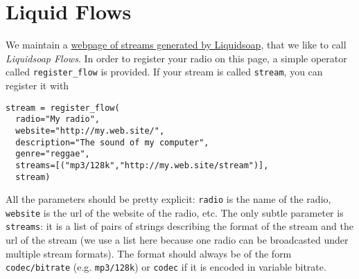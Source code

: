 \section{Liquid Flows}
We maintain a \href{http://savonet.sourceforge.net/flows.html}{webpage of streams generated by
Liquidsoap}, that we like to call
\emph{Liquidsoap Flows}. In order to register your radio on this page, a simple
operator called \verb+register_flow+ is provided. If your stream is called \verb+stream+,
you can register it with

\begin{verbatim}
stream = register_flow(
  radio="My radio",
  website="http://my.web.site/",
  description="The sound of my computer",
  genre="reggae",
  streams=[("mp3/128k","http://my.web.site/stream")],
  stream)
\end{verbatim}
All the parameters should be pretty explicit: \verb+radio+ is the name of the radio,
\verb+website+ is the url of the website of the radio, etc. The only subtle parameter
is \verb+streams+: it is a list of pairs of strings describing the format of the
stream and the url of the stream (we use a list here because one radio can be
broadcasted under multiple stream formats). The format should always be of the
form \verb+codec/bitrate+ (e.g. \verb+mp3/128k+) or \verb+codec+ if it is encoded in variable
bitrate.

